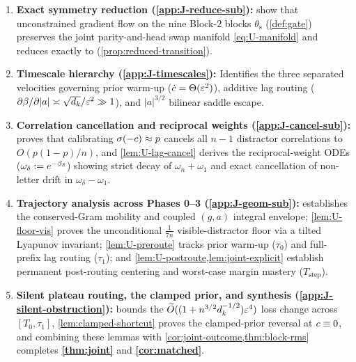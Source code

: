 \begin{enumerate}[leftmargin=*,nosep,topsep=3pt]
  \item \textbf{Exact symmetry reduction (\cref{app:J-reduce-sub}):}  show that unconstrained gradient flow on the nine Block-$2$ blocks $\theta_{\mathrm s}$ (\cref{def:gate}) preserves the joint parity-and-head swap manifold \cref{eq:U-manifold} and reduces exactly to \stepode{} (\cref{prop:reduced-transition}).
  \item \textbf{Timescale hierarchy (\cref{app:J-timescales}):} Identifies the three separated velocities governing prior warm-up ($\dot{c} = \Theta(\varepsilon^2)$), additive lag routing ($\partial\beta/\partial|a| \asymp \sqrt{d_k}/\varepsilon^2 \gg 1$), and $|a|^{3/2}$ bilinear saddle escape.
  \item \textbf{Correlation cancellation and reciprocal weights (\cref{app:J-cancel-sub}):}  proves that calibrating $\sigma(-c) \approx p$ cancels all $n-1$ distractor correlations to $O(p(1-p)/n)$, and \cref{lem:U-lag-cancel} derives the reciprocal-weight ODEs ($\omega_\delta := e^{-\beta_\delta}$) showing strict decay of $\omega_n + \omega_1$ and exact cancellation of non-letter drift in $\omega_\delta - \omega_1$.
  \item \textbf{Trajectory analysis across Phases 0--3 (\cref{app:J-geom-sub}):}  establishes the conserved-Gram mobility and coupled $(g,a)$ integral envelope; \cref{lem:U-floor-vis} proves the unconditional $\frac{1}{7n}$ visible-distractor floor via a tilted Lyapunov invariant; \cref{lem:U-preroute} tracks prior warm-up ($\tau_0$) and full-prefix lag routing ($\tau_1$); and \cref{lem:U-postroute,lem:joint-explicit} establish permanent post-routing centering and worst-case margin mastery ($T_{\mathrm{step}}$).
  \item \textbf{Silent plateau routing, the clamped prior, and synthesis (\cref{app:J-silent-obstruction}):}  bounds the $\widetilde O((1 + n^{3/2}d_k^{-1/2})\varepsilon^4)$ loss change across $[T_0, \tau_1]$, \cref{lem:clamped-shortcut} proves the clamped-prior reversal at $c \equiv 0$, and combining these lemmas with \cref{cor:joint-outcome,thm:block-rms} completes \textbf{\cref{thm:joint}} and \textbf{\cref{cor:matched}}.
\end{enumerate}

